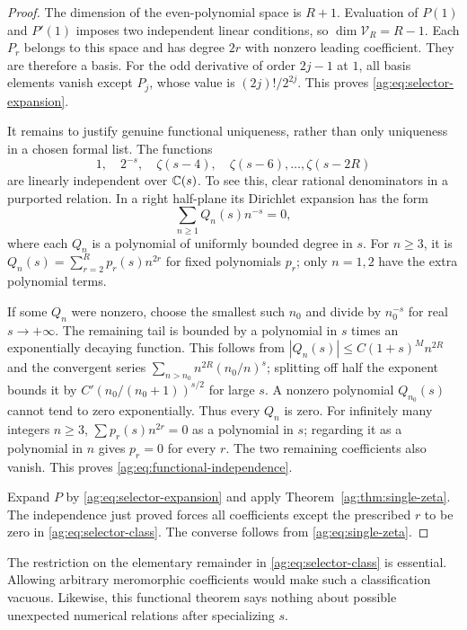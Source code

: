 \begin{proof}
The dimension of the even-polynomial space is $R+1$. Evaluation of
$P(1)$ and $P'(1)$ imposes two independent linear conditions, so
$\dim\mathscr V_R=R-1$. Each $P_r$ belongs to this space and has degree
$2r$ with nonzero leading coefficient. They are therefore a basis.
For the odd derivative of order $2j-1$ at $1$, all basis elements vanish
except $P_j$, whose value is $(2j)!/2^{2j}$. This proves
\eqref{ag:eq:selector-expansion}.

It remains to justify genuine functional uniqueness, rather than only
uniqueness in a chosen formal list. The functions
\begin{equation}\label{ag:eq:functional-independence}
 1,\quad 2^{-s},\quad \zeta(s-4),\quad\zeta(s-6),\ldots,\zeta(s-2R)
\end{equation}
are linearly independent over $\mathbb C(s)$. To see this, clear rational
denominators in a purported relation. In a right half-plane its
Dirichlet expansion has the form
\[
 \sum_{n\ge1}Q_n(s)n^{-s}=0,
\]
where each $Q_n$ is a polynomial of uniformly bounded degree in $s$.
For $n\ge3$, it is
$Q_n(s)=\sum_{r=2}^Rp_r(s)n^{2r}$ for fixed polynomials $p_r$;
only $n=1,2$ have the extra polynomial terms.

If some $Q_n$ were nonzero, choose the smallest such $n_0$ and divide
by $n_0^{-s}$ for real $s\to+\infty$. The remaining tail is bounded by
a polynomial in $s$ times an exponentially decaying function. This
follows from $|Q_n(s)|\le C(1+s)^M n^{2R}$ and the convergent series
$\sum_{n>n_0}n^{2R}(n_0/n)^s$; splitting off half the exponent bounds
it by $C'(n_0/(n_0+1))^{s/2}$ for large $s$.
A nonzero polynomial $Q_{n_0}(s)$ cannot tend to zero exponentially.
Thus every $Q_n$ is zero. For infinitely many integers $n\ge3$,
$\sum p_r(s)n^{2r}=0$ as a polynomial in $s$; regarding it as a
polynomial in $n$ gives $p_r=0$ for every $r$. The two remaining
coefficients also vanish. This proves \eqref{ag:eq:functional-independence}.

Expand $P$ by \eqref{ag:eq:selector-expansion} and apply
Theorem~\ref{ag:thm:single-zeta}. The independence just proved forces
all coefficients except the prescribed $r$ to be zero in
\eqref{ag:eq:selector-class}. The converse follows from
\eqref{ag:eq:single-zeta}.
\end{proof}

The restriction on the elementary remainder in
\eqref{ag:eq:selector-class} is essential. Allowing arbitrary
meromorphic coefficients would make such a classification vacuous.
Likewise, this functional theorem says nothing about possible
unexpected numerical relations after specializing $s$.

